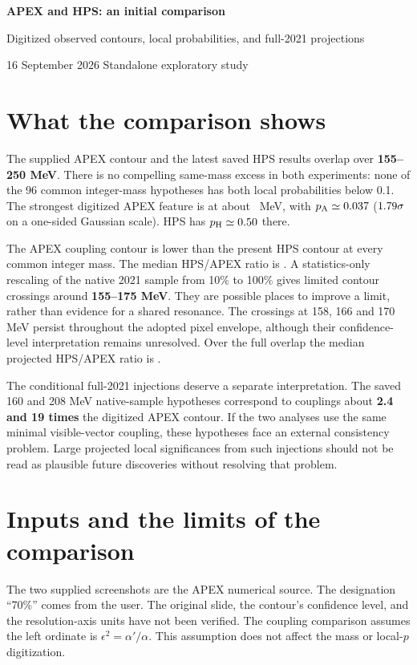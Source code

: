 \documentclass[10pt,letterpaper]{article}
\newcommand{\eps}{\epsilon^2}
\begin{document}
\thispagestyle{empty}
{\LARGE\bfseries APEX and HPS: an initial comparison}\par
{\large Digitized observed contours, local probabilities, and full-2021 projections}\par
16 September 2026 \hfill Standalone exploratory study

\section*{What the comparison shows}
The supplied APEX contour and the latest saved HPS results overlap over
\textbf{155--250 MeV}. There is no compelling same-mass excess in both experiments:
none of the 96 common integer-mass hypotheses has both local probabilities below
0.1. The strongest digitized APEX feature is at about \ApexMinMass\ MeV,
with $p_{\rm A}\simeq0.037$ ($1.79\sigma$ on a one-sided Gaussian scale).
HPS has $p_{\rm H}\simeq0.50$ there.

The APEX coupling contour is lower than the present HPS contour at every common
integer mass. The median HPS/APEX ratio is \MedianCurrentRatio.
A statistics-only rescaling of the native 2021 sample from 10\% to 100\% gives
limited contour crossings around \textbf{155--175 MeV}. They are possible places
to improve a limit, rather than evidence for a shared resonance.
The crossings at 158, 166 and 170 MeV persist throughout the adopted pixel
envelope, although their confidence-level interpretation remains unresolved.
Over the full overlap the median projected HPS/APEX ratio is
\MedianProjectionRatio.

The conditional full-2021 injections deserve a separate interpretation. The saved
160 and 208 MeV native-sample hypotheses correspond to couplings about
\textbf{2.4 and 19 times} the digitized APEX contour. If the two analyses use the
same minimal visible-vector coupling, these hypotheses face an external
consistency problem. Large projected local significances from such injections
should not be read as plausible future discoveries without resolving that problem.

\section*{Inputs and the limits of the comparison}
The two supplied screenshots are the APEX numerical source. The designation
``70\%'' comes from the user. The original slide, the contour's confidence level,
and the resolution-axis units have not been verified. The coupling comparison
assumes the left ordinate is $\eps=\alpha'/\alpha$. This assumption does not
affect the mass or local-$p$ digitization.
\end{document}
